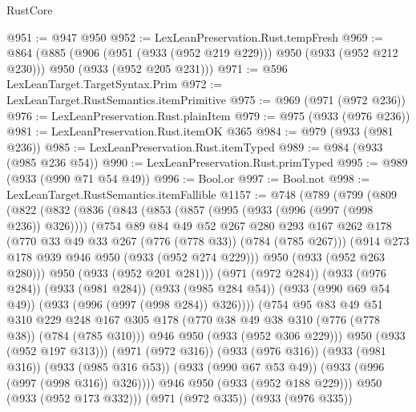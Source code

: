 \begin{lexlean}{RustCore}
\begin{coremodule}
@951 := @947 @950
@952 := LexLeanPreservation.Rust.tempFresh
@969 := @864
    (@885
      (@906 (@951 (@933 (@952 @219 @229))) @950 (@933 (@952 @212 @230)))
      @950
      (@933 (@952 @205 @231)))
@971 := @596 LexLeanTarget.TargetSyntax.Prim
@972 := LexLeanTarget.RustSemantics.itemPrimitive
@975 := @969 (@971 (@972 @236))
@976 := LexLeanPreservation.Rust.plainItem
@979 := @975 (@933 (@976 @236))
@981 := LexLeanPreservation.Rust.itemOK @365
@984 := @979 (@933 (@981 @236))
@985 := LexLeanPreservation.Rust.itemTyped
@989 := @984 (@933 (@985 @236 @54))
@990 := LexLeanPreservation.Rust.primTyped
@995 := @989 (@933 (@990 @71 @54 @49))
@996 := Bool.or
@997 := Bool.not
@998 := LexLeanTarget.RustSemantics.itemFallible
@1157 := @748
    (@789
      (@799
        (@809
          (@822
            (@832
              (@836
                (@843
                  (@853
                    (@857 (@995 (@933 (@996 (@997 (@998 @236)) @326))))
                    (@754
                      @89
                      @84
                      @49
                      @52
                      @267
                      @280
                      @293
                      @167
                      @262
                      @178
                      (@770 @33 @49 @33 @267 (@776 (@778 @33)) (@784 (@785 @267)))
                      (@914 @273 @178 @939 @946 @950 (@933 (@952 @274 @229)))
                      @950
                      (@933 (@952 @263 @280)))
                    @950
                    (@933 (@952 @201 @281)))
                  (@971 (@972 @284))
                  (@933 (@976 @284))
                  (@933 (@981 @284))
                  (@933 (@985 @284 @54))
                  (@933 (@990 @69 @54 @49))
                  (@933 (@996 (@997 (@998 @284)) @326))))
              (@754
                @95
                @83
                @49
                @51
                @310
                @229
                @248
                @167
                @305
                @178
                (@770 @38 @49 @38 @310 (@776 (@778 @38)) (@784 (@785 @310)))
                @946
                @950
                (@933 (@952 @306 @229)))
              @950
              (@933 (@952 @197 @313)))
            (@971 (@972 @316))
            (@933 (@976 @316))
            (@933 (@981 @316))
            (@933 (@985 @316 @53))
            (@933 (@990 @67 @53 @49))
            (@933 (@996 (@997 (@998 @316)) @326))))
        @946
        @950
        (@933 (@952 @188 @229)))
      @950
      (@933 (@952 @173 @332)))
    (@971 (@972 @335))
    (@933 (@976 @335))

\end{coremodule}
\end{lexlean}
